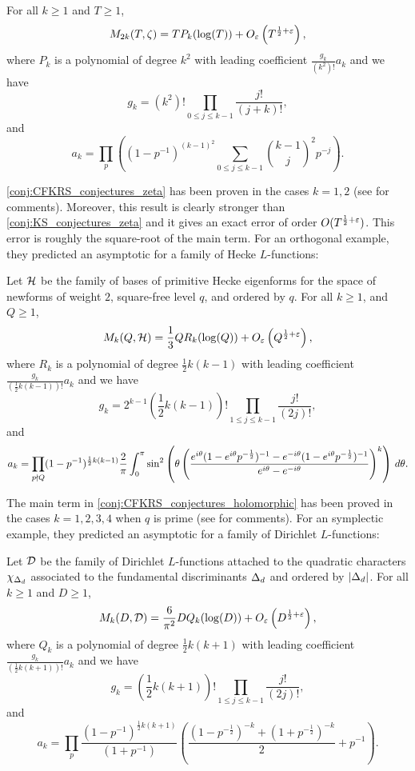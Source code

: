   \begin{conjecture}\label{conj:CFKRS_conjectures_zeta}
    For all $k \ge 1$ and $T \ge 1$,
    \[
      M_{2k}(T,\zeta) = TP_{k}(\log(T))+O_{\varepsilon}\left(T^{\frac{1}{2}+\varepsilon}\right),
    \]
    where $P_{k}$ is a polynomial of degree $k^{2}$ with leading coefficient $\frac{g_{k}}{(k^{2})!}a_{k}$ and we have
    \[
      g_{k} = (k^{2})!\prod_{0 \le j \le k-1}\frac{j!}{(j+k)!},
    \]
    and
    \[
      a_{k} = \prod_{p}\left((1-p^{-1})^{(k-1)^{2}}\sum_{0 \le j \le k-1}\binom{k-1}{j}^{2}p^{-j}\right).
    \]
  \end{conjecture}

  \cref{conj:CFKRS_conjectures_zeta} has been proven in the cases $k = 1,2$ (see \cite{conrey2005integral} for comments). Moreover, this result is clearly stronger than \cref{conj:KS_conjectures_zeta} and it gives an exact error of order $O(T^{\frac{1}{2}+\varepsilon})$. This error is roughly the square-root of the main term. For an orthogonal example, they predicted an asymptotic for a family of Hecke $L$-functions:

  \begin{conjecture}\label{conj:CFKRS_conjectures_holomorphic}
    Let $\mathcal{H}$ be the family of bases of primitive Hecke eigenforms for the space of newforms of weight $2$, square-free level $q$, and ordered by $q$. For all $k \ge 1$, and $Q \ge 1$,
    \[
      M_{k}(Q,\mathcal{H}) = \frac{1}{3}QR_{k}(\log(Q))+O_{\varepsilon}\left(Q^{\frac{1}{2}+\varepsilon}\right),
    \]
    where $R_{k}$ is a polynomial of degree $\frac{1}{2}k(k-1)$ with leading coefficient $\frac{g_{k}}{\left(\frac{1}{2}k(k-1)\right)!}a_{k}$ and we have
    \[
      g_{k} = 2^{k-1}\left(\frac{1}{2}k(k-1)\right)!\prod_{1 \le j \le k-1}\frac{j!}{(2j)!},
    \]
    and
    \[
      a_{k} = \prod_{p \nmid Q}(1-p^{-1})^{\frac{1}{2}k(k-1)}\frac{2}{\pi}\int_{0}^{\pi}\sin^{2}\left(\theta\left(\frac{e^{i\theta}(1-e^{i\theta}p^{-\frac{1}{2}})^{-1}-e^{-i\theta}(1-e^{i\theta}p^{-\frac{1}{2}})^{-1}}{e^{i\theta}-e^{-i\theta}}\right)^{k}\right)\,d\theta.
    \]
  \end{conjecture}

  The main term in \cref{conj:CFKRS_conjectures_holomorphic} has been proved in the cases $k = 1,2,3,4$ when $q$ is prime (see \cite{conrey2005integral} for comments). For an symplectic example, they predicted an asymptotic for a family of Dirichlet $L$-functions:

  \begin{conjecture}\label{conj:CFKRS_conjectures_Dirichlet}
    Let $\mathcal{D}$ be the family of Dirichlet $L$-functions attached to the quadratic characters $\chi_{\Delta_{d}}$ associated to the fundamental discriminants $\Delta_{d}$ and ordered by $|\Delta_{d}|$. For all $k \ge 1$ and $D \ge 1$,
    \[
      M_{k}(D,\mathcal{D}) = \frac{6}{\pi^{2}}DQ_{k}(\log(D))+O_{\varepsilon}\left(D^{\frac{1}{2}+\varepsilon}\right),
    \]
    where $Q_{k}$ is a polynomial of degree $\frac{1}{2}k(k+1)$ with leading coefficient $\frac{g_{k}}{\left(\frac{1}{2}k(k+1)\right)!}a_{k}$ and we have
    \[
      g_{k} = \left(\frac{1}{2}k(k+1)\right)!\prod_{1 \le j \le k-1}\frac{j!}{(2j)!},
    \]
    and
    \[
      a_{k} = \prod_{p}\frac{(1-p^{-1})^{\frac{1}{2}k(k+1)}}{(1+p^{-1})}\left(\frac{(1-p^{-\frac{1}{2}})^{-k}+(1+p^{-\frac{1}{2}})^{-k}}{2}+p^{-1}\right).
    \]
  \end{conjecture}

